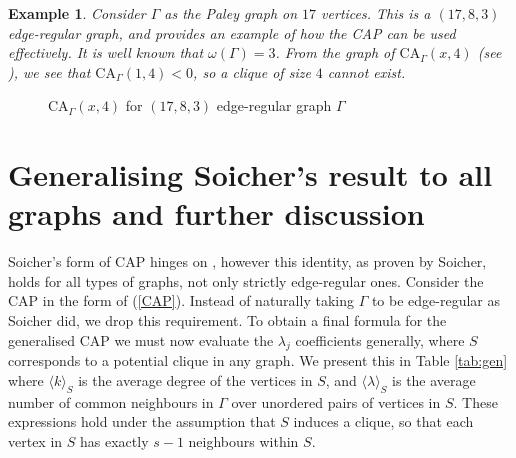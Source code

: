 \documentclass[11pt, baustms]{amsproc}
\theoremstyle{scplain}
\newtheorem*{rexample}{Example}
\newcommand\CA{\mathrm{CA}}
\begin{document}
\begin{rexample}
    Consider $\Gamma$ as the Paley graph on $17$ vertices. This is a $(17,8,3)$ edge-regular graph, and provides an example of how the CAP can be used effectively. It is well known that $\omega(\Gamma) = 3$.
From the graph of $\CA_\Gamma(x,4)$ (see ), we see that $\CA_\Gamma(1,4) < 0$, so a clique of size $4$ cannot exist.
\end{rexample}
\begin{figure}[!ht]
\caption{$\CA_\Gamma(x,4)$ for $(17,8,3)$ edge-regular graph $\Gamma$}
\label{paleyex}
\end{figure}



\section{Generalising Soicher's result to all graphs and further discussion}

Soicher's form of CAP hinges on , however this identity, as proven by Soicher, holds for all types of graphs, not only strictly edge-regular ones. Consider the CAP in the form of (\ref{CAP}). Instead of naturally taking $\Gamma$ to be edge-regular as Soicher did, we drop this requirement. To obtain a final formula for the generalised CAP we must now evaluate the $\lambda_j$ coefficients generally, where $S$ corresponds to a potential clique in any graph. We present this in Table \ref{tab:gen} where \(\langle k\rangle_S\) is the average degree of the vertices in \(S\), and \(\langle\lambda\rangle_S\) is the average number of common neighbours in \(\Gamma\) over unordered pairs of vertices in \(S\). These expressions hold under the assumption that $S$ induces a clique, so that each vertex in $S$ has exactly $s-1$ neighbours within $S$.
\end{document}

